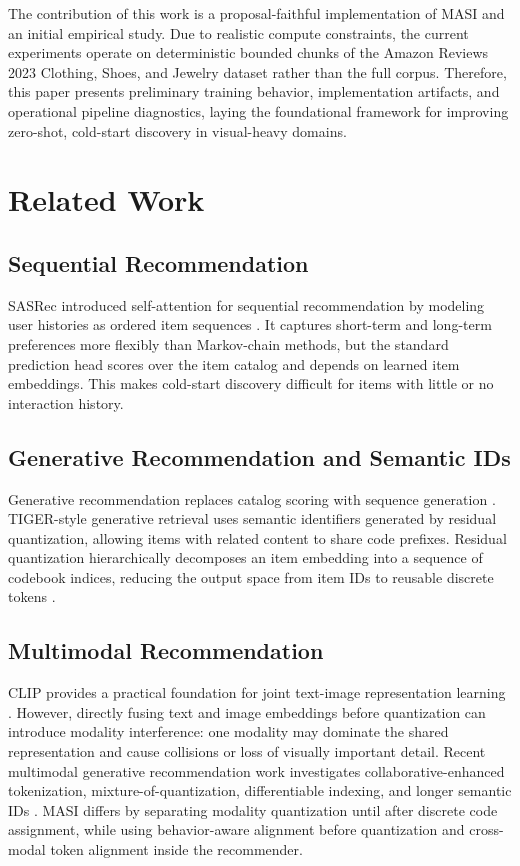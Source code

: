 \documentclass[conference]{IEEEtran}
\begin{document}
The contribution of this work is a proposal-faithful implementation of MASI and an initial empirical study. Due to realistic compute constraints, the current experiments operate on deterministic bounded chunks of the Amazon Reviews 2023 Clothing, Shoes, and Jewelry dataset rather than the full corpus. Therefore, this paper presents preliminary training behavior, implementation artifacts, and operational pipeline diagnostics, laying the foundational framework for improving zero-shot, cold-start discovery in visual-heavy domains.

\section{Related Work}
\subsection{Sequential Recommendation}
SASRec introduced self-attention for sequential recommendation by modeling user histories as ordered item sequences \cite{kang2018self}. It captures short-term and long-term preferences more flexibly than Markov-chain methods, but the standard prediction head scores over the item catalog and depends on learned item embeddings. This makes cold-start discovery difficult for items with little or no interaction history.

\subsection{Generative Recommendation and Semantic IDs}
Generative recommendation replaces catalog scoring with sequence generation \cite{rajput2023recommender,geng2022recommendation}. TIGER-style generative retrieval uses semantic identifiers generated by residual quantization, allowing items with related content to share code prefixes. Residual quantization hierarchically decomposes an item embedding into a sequence of codebook indices, reducing the output space from item IDs to reusable discrete tokens \cite{lee2022autoregressive}.

\subsection{Multimodal Recommendation}
CLIP provides a practical foundation for joint text-image representation learning \cite{radford2021learning}. However, directly fusing text and image embeddings before quantization can introduce modality interference: one modality may dominate the shared representation and cause collisions or loss of visually important detail. Recent multimodal generative recommendation work investigates collaborative-enhanced tokenization, mixture-of-quantization, differentiable indexing, and longer semantic IDs \cite{zhu2025beyond,xu2025mmq,lin2026cemg,fu2026differentiable,xia2026unleash}. MASI differs by separating modality quantization until after discrete code assignment, while using behavior-aware alignment before quantization and cross-modal token alignment inside the recommender.
\end{document}
